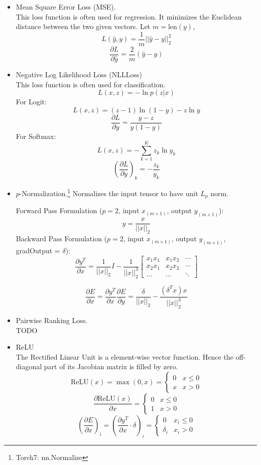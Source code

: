 \begin{itemize}
 \item Mean Square Error Loss (MSE).\\
	 This loss function is often used for regression. It minimizes the
	 Euclidean distance between the two given vectors.
	 Let $m = \text{len}(y)$,
	 $$L(\hat{y}, y) = \frac{1}{m} || \hat{y} - y ||_2^2 $$
	 $$\frac{\partial L}{\partial \hat{y}} = \frac{2}{m} (\hat{y} - y) $$

 \item Negative Log Likelihood Loss (NLLLoss)\\
	 This loss function is often used for classification.
	  $$L(x,z) = -\ln p(z|x)$$
	 For Logit:
	 $$L(x,z) = (z-1)\ln(1-y) - z\ln y$$
	 $$ \frac{\partial L}{\partial y} = \frac{y-z}{y(1-y)}$$
	 For Softmax:
	$$L(x,z) = -\sum_{k=1}^K z_k \ln y_k$$
	$$(\frac{\partial L}{\partial y})_k = - \frac{z_k}{y_k}$$

 \item $p$-Normalization.\footnote{Torch7: nn.Normalize}
	 Normalizes the input tensor to have unit $L_p$ norm.

	 Forward Pass Formulation ($p=2$, input $x_{(m\times 1)}$, output $y_{(m\times 1)}$):
		 $$y = \frac{x}{||x||_2}$$
	 Backward Pass Formulation ($p=2$, input $x_{(m\times 1)}$, output $y_{(m\times 1)}$, gradOutput = $\delta$):
		 $$\frac{\partial y^T}{\partial x} = \frac{1}{||x||_2} I
			- \frac{1}{||x||_2^3} \begin{bmatrix}
				x_1x_1 & x_1x_2 & \cdots \\
				x_2x_1 & x_2x_2 & \cdots \\
			\ldots & \ldots & \ddots \end{bmatrix}$$

		 $$\frac{\partial E}{\partial x} = \frac{\partial y^T}{\partial x} \frac{\partial E}{\partial y}
			= \frac{\delta}{||x||_2} - \frac{(\delta^T x)x}{||x||_2^3}$$

 \item Pairwise Ranking Loss.\\
	 TODO

 \item ReLU\\
	 The Rectified Linear Unit is a element-wise vector function. Hence
	 the off-diagonal part of its Jacobian matrix is filled by zero.
	 $$\text{ReLU}(x) = \max(0,x) = \left\{ \begin{array}{lr}
	  0 & x\leqslant 0 \\
	  x & x>0
	  \end{array} \right. $$
	 $$\frac{\partial \text{ReLU}(x)}{\partial x} = \left\{ \begin{array}{lr}
	  0 & x\leqslant 0 \\
	  1 & x>0
	  \end{array} \right. $$
	 $$(\frac{\partial E}{\partial x})_i = (\frac{\partial y^T}{\partial x}
	  \cdot \delta)_i = \left\{ \begin{array}{lr}
	  0 & x_i\leqslant 0 \\
	  \delta_i & x_i>0 \end{array} \right. $$


\end{itemize}
